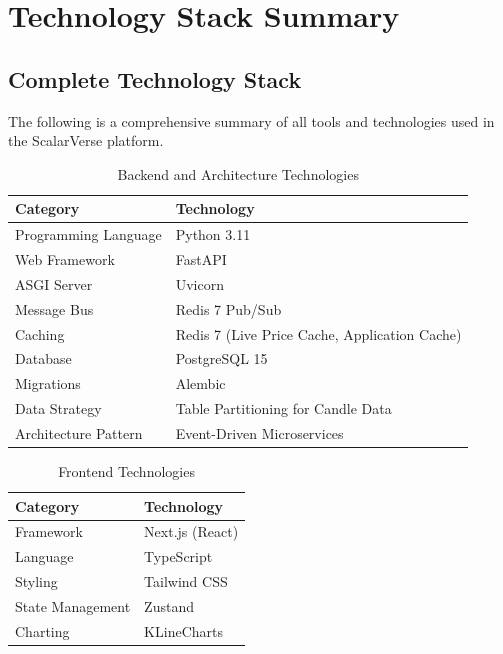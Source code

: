 \chapter{Technology Stack Summary}
\section{Complete Technology Stack}

The following is a comprehensive summary of all tools and technologies used in the ScalarVerse platform.

\begin{table}[htb]
\fontsize{10}{12}\selectfont
\caption{Backend and Architecture Technologies}
\label{tab:backend_tech}
\centering
\begin{tabular}{|p{4cm}|p{8cm}|}
	\hline
	\textbf{Category} & \textbf{Technology} \\
	\hline
	Programming Language & Python 3.11 \\
	\hline
	Web Framework & FastAPI \\
	\hline
	ASGI Server & Uvicorn \\
	\hline
	Message Bus & Redis 7 Pub/Sub \\
	\hline
	Caching & Redis 7 (Live Price Cache, Application Cache) \\
	\hline
	Database & PostgreSQL 15 \\
	\hline
	Migrations & Alembic \\
	\hline
	Data Strategy & Table Partitioning for Candle Data \\
	\hline
	Architecture Pattern & Event-Driven Microservices \\
	\hline
\end{tabular}
\end{table}

\begin{table}[htb]
\fontsize{10}{12}\selectfont
\caption{Frontend Technologies}
\label{tab:frontend_tech}
\centering
\begin{tabular}{|p{4cm}|p{8cm}|}
	\hline
	\textbf{Category} & \textbf{Technology} \\
	\hline
	Framework & Next.js (React) \\
	\hline
	Language & TypeScript \\
	\hline
	Styling & Tailwind CSS \\
	\hline
	State Management & Zustand \\
	\hline
	Charting & KLineCharts \\
	\hline
\end{tabular}
\end{table}

